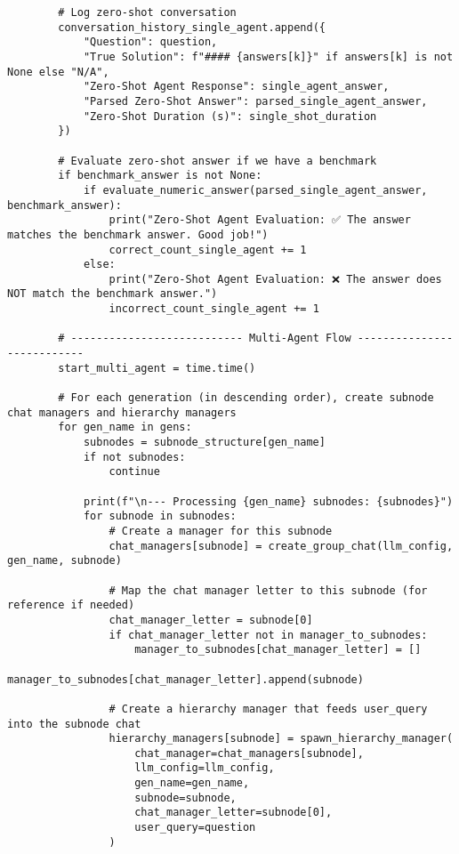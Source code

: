 \begin{lstlisting}
        # Log zero-shot conversation
        conversation_history_single_agent.append({
            "Question": question,
            "True Solution": f"#### {answers[k]}" if answers[k] is not None else "N/A",
            "Zero-Shot Agent Response": single_agent_answer,
            "Parsed Zero-Shot Answer": parsed_single_agent_answer,
            "Zero-Shot Duration (s)": single_shot_duration
        })

        # Evaluate zero-shot answer if we have a benchmark
        if benchmark_answer is not None:
            if evaluate_numeric_answer(parsed_single_agent_answer, benchmark_answer):
                print("Zero-Shot Agent Evaluation: ✅ The answer matches the benchmark answer. Good job!")
                correct_count_single_agent += 1
            else:
                print("Zero-Shot Agent Evaluation: ❌ The answer does NOT match the benchmark answer.")
                incorrect_count_single_agent += 1

        # --------------------------- Multi-Agent Flow ---------------------------
        start_multi_agent = time.time()

        # For each generation (in descending order), create subnode chat managers and hierarchy managers
        for gen_name in gens:
            subnodes = subnode_structure[gen_name]
            if not subnodes:
                continue

            print(f"\n--- Processing {gen_name} subnodes: {subnodes}")
            for subnode in subnodes:
                # Create a manager for this subnode
                chat_managers[subnode] = create_group_chat(llm_config, gen_name, subnode)

                # Map the chat manager letter to this subnode (for reference if needed)
                chat_manager_letter = subnode[0]
                if chat_manager_letter not in manager_to_subnodes:
                    manager_to_subnodes[chat_manager_letter] = []
                manager_to_subnodes[chat_manager_letter].append(subnode)

                # Create a hierarchy manager that feeds user_query into the subnode chat
                hierarchy_managers[subnode] = spawn_hierarchy_manager(
                    chat_manager=chat_managers[subnode],
                    llm_config=llm_config,
                    gen_name=gen_name,
                    subnode=subnode,
                    chat_manager_letter=subnode[0],
                    user_query=question
                )


\end{lstlisting}
